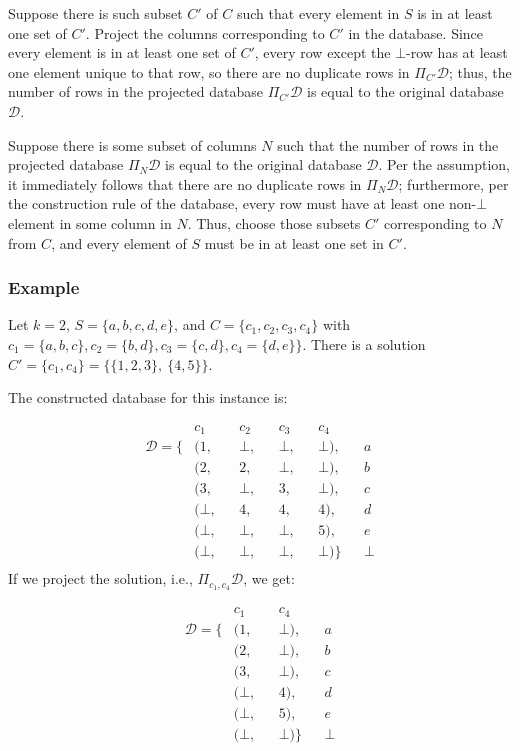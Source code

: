 \documentclass[12pt]{article}
\begin{document}
Suppose there is such subset $C'$ of $C$ such that every element in $S$ is in at least one set of $C'$. Project the columns corresponding to $C'$ in the database. Since every element is in at least one set of $C'$, every row except the $\bot$-row has at least one element unique to that row, so there are no duplicate rows in $\Pi_{C'} \mathcal{D}$; thus, the number of rows in the projected database $\Pi_{C'} \mathcal{D}$ is equal to the original database $\mathcal{D}$.

Suppose there is some subset of columns $N$ such that the number of rows in the projected database $\Pi_{N} \mathcal{D}$ is equal to the original database $\mathcal{D}$. Per the assumption, it immediately follows that there are no duplicate rows in $\Pi_{N} \mathcal{D}$; furthermore, per the construction rule of the database, every row must have at least one non-$\bot$ element in some column in $N$. Thus, choose those subsets $C'$ corresponding to $N$ from $C$, and every element of $S$ must be in at least one set in $C'$.

\subsubsection*{Example}
Let $k=2$, $S = \{a,b,c,d,e\}$, and $C = \{c_1,c_2,c_3,c_4\}$ with $c_1 = \{a,b,c\}, c_2 = \{b,d\}, c_3 = \{c,d\}, c_4 = \{d,e\}\}$. There is a solution $C' = \{c_1,c_4\} = \{\{1,2,3\},~\{4,5\}\}$.

The constructed database for this instance is:

\begin{align*}
                 &  c_1   && c_2   && c_3   && c_4     &&\\
\mathcal{D} = \{ & (1,    && \bot, && \bot, && \bot),  && a\\
                 & (2,    && 2,    && \bot, && \bot),  && b\\
                 & (3,    && \bot, && 3,    && \bot),  && c\\
                 & (\bot, && 4,    && 4,    && 4   ),  && d\\
                 & (\bot, && \bot, && \bot, && 5   ),  && e\\
                 & (\bot, && \bot, && \bot, && \bot)\} && \bot\\
\end{align*}
\vspace*{10pt}
If we project the solution, i.e., $\Pi_{c_1,c_4} \mathcal{D}$, we get:

\begin{align*}
                 &  c_1   && c_4     &&\\
\mathcal{D} = \{ & (1,    && \bot),  && a\\
                 & (2,    && \bot),  && b\\
                 & (3,    && \bot),  && c\\
                 & (\bot, && 4   ),  && d\\
                 & (\bot, && 5   ),  && e\\
                 & (\bot, && \bot)\} && \bot\\
\end{align*}
\end{document}
